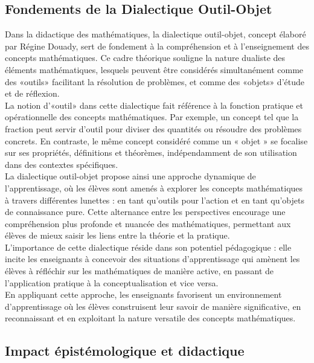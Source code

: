 \subsection{Fondements de la Dialectique Outil-Objet}

Dans la didactique des mathématiques,
la dialectique outil-objet,
concept élaboré par Régine Douady,
sert de fondement à la compréhension et à l'enseignement des concepts mathématiques.
Ce cadre théorique souligne la nature dualiste des éléments mathématiques,
lesquels peuvent être considérés simultanément comme des «outils» facilitant la résolution de problèmes,
et comme des «objets» d'étude et de réflexion.\\

La notion d'«outil» dans cette dialectique fait référence à la fonction pratique et opérationnelle des concepts mathématiques.
Par exemple,
un concept tel que la fraction peut servir d'outil pour diviser des quantités ou résoudre des problèmes concrets.
En contraste,
le même concept considéré comme un « objet » se focalise sur ses propriétés,
définitions et théorèmes,
indépendamment de son utilisation dans des contextes spécifiques.\\

La dialectique outil-objet propose ainsi une approche dynamique de l'apprentissage,
où les élèves sont amenés à explorer les concepts mathématiques à travers différentes lunettes :
en tant qu'outils pour l'action et en tant qu'objets de connaissance pure.
Cette alternance entre les perspectives encourage une compréhension plus profonde et nuancée des mathématiques,
permettant aux élèves de mieux saisir les liens entre la théorie et la pratique.\\

L'importance de cette dialectique réside dans son potentiel pédagogique :
elle incite les enseignants à concevoir des situations d'apprentissage qui amènent les élèves à réfléchir sur les mathématiques de manière active,
en passant de l'application pratique à la conceptualisation et vice versa.\\
En appliquant cette approche,
les enseignants favorisent un environnement d'apprentissage où les élèves construisent leur savoir de manière significative,
en reconnaissant et en exploitant la nature versatile des concepts mathématiques.

\subsection{Impact épistémologique et didactique}

